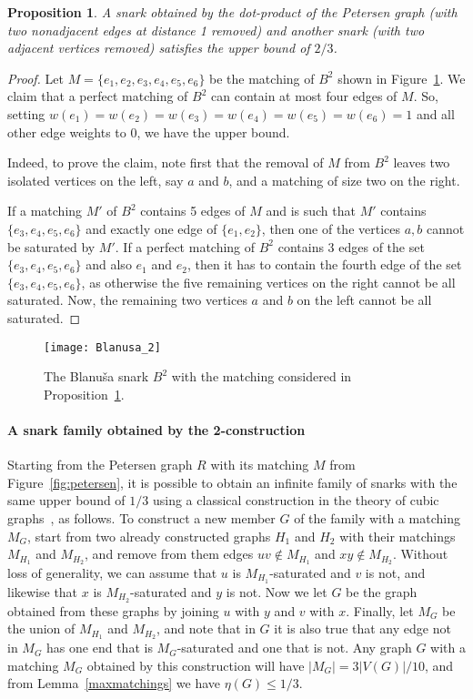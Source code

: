 \documentclass{article}
\newtheorem{proposition}[thm]{Proposition}
\begin{document}
\begin{proposition}\label{B2geral}
A snark obtained by the dot-product of the Petersen graph (with two nonadjacent edges at distance 1 removed) and another snark (with two adjacent vertices removed) satisfies the upper bound of $2/3$.
\end{proposition}
\begin{proof}
Let $M=\{e_1,e_2,e_3,e_4,e_5,e_6\}$ be the matching of $B^2$ shown in Figure~\ref{fig:B2}. We claim that a perfect matching of $B^2$ can contain at most four edges of $M$. So, setting $w(e_1)=w(e_2)=w(e_3)=w(e_4)=w(e_5)=w(e_6)=1$ and all other edge weights to $0$, we have the upper bound.

Indeed, to prove the claim, note first that the removal of $M$ from $B^2$
leaves two isolated vertices on the left, say $a$ and $b$,
and a matching of size two on the right.

If a matching $M'$ of $B^2$ contains 5 edges of $M$ and is such that $M'$ contains $\{e_3,e_4,e_5,e_6\}$ and exactly one edge of $\{e_1, e_2\}$, 
then one of the vertices $a, b$ cannot be saturated by $M'$.
If a perfect matching of $B^2$ contains 3 edges of the set $\{e_3,e_4,e_5,e_6\}$ and also $e_1$ and $e_2$, then it has to contain the fourth edge of the set $\{e_3,e_4,e_5,e_6\}$,
as otherwise the five remaining vertices on the right cannot be all
saturated. Now, the remaining two vertices $a$ and $b$ on the left cannot be all
saturated.
\end{proof}

\begin{figure}[ht]
\centering
\texttt{[image: Blanusa\_2]}
\caption{The Blanu\v{s}a snark $B^2$ with the matching considered in Proposition~\ref{B2geral}.}
\label{fig:B2}
\end{figure}

\paragraph{A snark family obtained by the 2-construction}
Starting from the Petersen graph $R$ with its matching $M$ from Figure~\ref{fig:petersen}, it is possible to obtain an infinite family of snarks with the same upper bound of $1/3$ using a classical construction in the theory of cubic graphs~\cite{isaacs75,Sasaki}, as follows. To construct a new member $G$ of the family with a matching $M_G$, start from two already constructed graphs $H_1$ and $H_2$ with their matchings $M_{H_1}$ and $M_{H_2}$, and remove from them edges $uv \not\in M_{H_1}$ and $xy \not\in M_{H_2}$. Without loss of generality, we can assume that $u$ is $M_{H_1}$-saturated and $v$ is not, and likewise that $x$ is $M_{H_2}$-saturated and $y$ is not. Now we let $G$ be the graph obtained from these graphs by joining $u$ with $y$ and $v$ with $x$. Finally, let $M_G$ be the union of $M_{H_1}$ and $M_{H_2}$, and note that in $G$ it is also true that any edge not in $M_G$ has one end that is $M_G$-saturated and one that is not. Any graph $G$ with a matching $M_G$ obtained by this construction will have $|M_G| = 3|V(G)|/10$, and from Lemma~\ref{maxmatchings} we have $\eta(G) \leq 1/3$.
\end{document}
